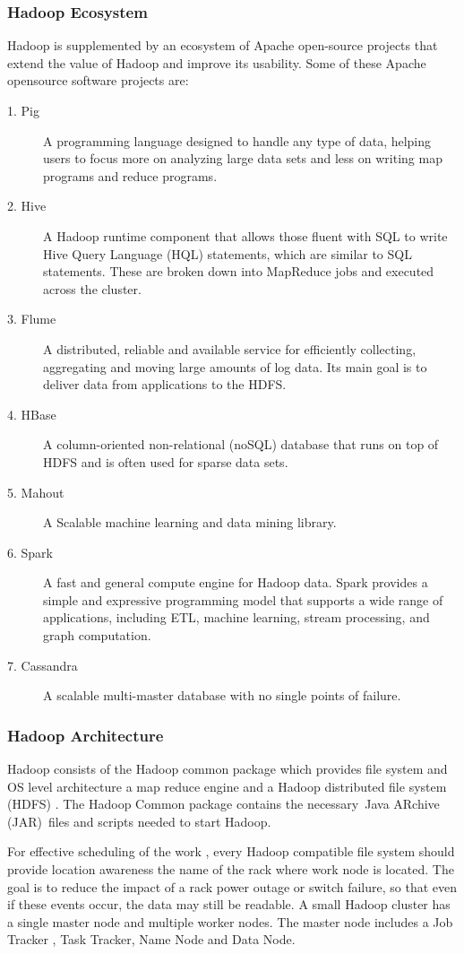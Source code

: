 \subsubsection{Hadoop Ecosystem}
Hadoop is supplemented by an ecosystem of Apache open-source projects that extend the value of Hadoop and improve its usability. Some of these Apache opensource software projects are: 
\begin{description}

\item[1. Pig]A programming language designed to handle any type of data, helping users to focus more on analyzing large data sets and less on writing map programs and reduce programs. 
\item[2. Hive]A Hadoop runtime component that allows those fluent with SQL to write Hive Query Language (HQL) statements, which are similar to SQL statements. These are broken down into MapReduce jobs and executed across the cluster.
\item[3. Flume]A distributed, reliable and available service for efficiently collecting, aggregating and moving large amounts of log data. Its main goal is to deliver data from applications to the HDFS. 
\item[4. HBase]A column-oriented non-relational (noSQL) database that runs on top of HDFS and is often used for sparse data sets. 
\item[5. Mahout]A Scalable machine learning and data mining library.
\item[6. Spark]A fast and general compute engine for Hadoop data. Spark provides a simple and expressive programming model that supports a wide range of applications, including ETL, machine learning, stream processing, and graph computation.
\item[7. Cassandra]A scalable multi-master database with no single points of failure.
\end{description}

\subsubsection{Hadoop Architecture}
Hadoop consists of the Hadoop common package which provides file system and OS level architecture a map reduce engine and a Hadoop distributed file system (HDFS) . The Hadoop Common package contains the necessary Java ARchive (JAR) files and scripts needed to start Hadoop.  

For effective scheduling of the work , every Hadoop compatible file system should provide location awareness the name of the rack where work node is located. The goal is to reduce the impact of a rack power outage or switch failure, so that even if these events occur, the data may still be readable. A small Hadoop cluster has a single master node and multiple worker nodes. The master node includes  a Job Tracker , Task Tracker, Name Node and Data Node. 

